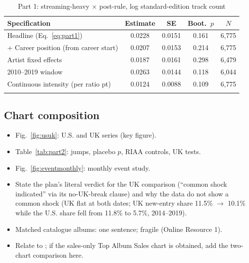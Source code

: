 \documentclass[pdflatex,sn-apa]{sn-jnl}
\begin{document}
\begin{table}[h]
\caption{Part 1: streaming-heavy $\times$ post-rule, log standard-edition track count}
\label{tab:part1}
\small
\begin{tabular}{@{}lcccc@{}}
\toprule
Specification & Estimate & SE & Boot.\ $p$ & $N$ \\
\midrule
Headline (Eq.~\ref{eq:part1})              & 0.0228 & 0.0151 & 0.161 & 6,775 \\
+ Career position (from career start)      & 0.0207 & 0.0153 & 0.214 & 6,775 \\
Artist fixed effects                        & 0.0187 & 0.0161 & 0.298 & 6,479 \\
2010--2019 window                           & 0.0263 & 0.0144 & 0.118 & 6,044 \\
Continuous intensity (per ratio pt)        & 0.0124 & 0.0088 & 0.109 & 6,775 \\
\botrule
\end{tabular}
\end{table}

\subsection{Chart composition}\label{sec:part2}

\begin{itemize}
  \item Fig.~\ref{fig:usuk}: U.S. and UK series (key figure).
  \item Table~\ref{tab:part2}: jumps, placebo $p$, RIAA controls, UK tests.
  \item Fig.~\ref{fig:eventmonthly}: monthly event study.
  \item State the plan's literal verdict for the UK comparison (``common shock indicated'' via its no-UK-break clause) and why the data do not show a common shock (UK flat at both dates; UK new-entry share 11.5\% $\to$ 10.1\% while the U.S. share fell from 11.8\% to 5.7\%, 2014--2019).
  \item Matched catalogue albums: one sentence; fragile (Online Resource 1).
  \item Relate to \citet{schneider2019five}; if the sales-only Top Album Sales chart is obtained, add the two-chart comparison here.
\end{itemize}
\end{document}
